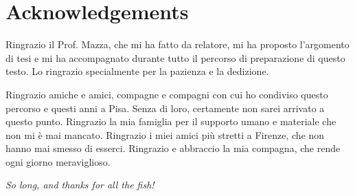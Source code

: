 \chapter*{Acknowledgements}

Ringrazio il Prof. Mazza, che mi ha fatto da relatore, mi ha proposto l'argomento di tesi e mi ha accompagnato durante tutto il percorso di preparazione di questo testo. Lo ringrazio specialmente per la pazienza e la dedizione.

Ringrazio amiche e amici, compagne e compagni con cui ho condiviso questo percorso e questi anni a Pisa. Senza di loro, certamente non sarei arrivato a questo punto. Ringrazio la mia famiglia per il supporto umano e materiale che non mi è mai mancato. Ringrazio i miei amici più stretti a Firenze, che non hanno mai smesso di esserci. Ringrazio e abbraccio la mia compagna, che rende ogni giorno meraviglioso.

\vfill
\begin{flushright}
	\emph{So long, and thanks for all the fish!} \\
	\citeauthor{adams2009hitchhikers} \cite{adams2009hitchhikers}
\end{flushright}
